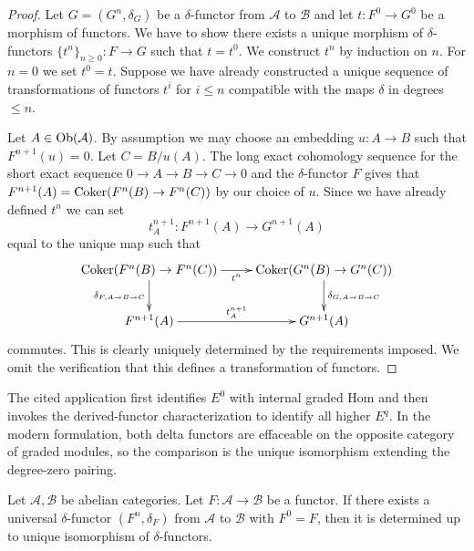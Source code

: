 \begin{proof}
Let $G = (G^n, \delta_G)$ be a $\delta$-functor
from $\mathcal{A}$ to $\mathcal{B}$ and let $t : F^0 \to G^0$
be a morphism of functors. We have to show there exists
a unique morphism of $\delta$-functors $\{t^n\}_{n \geq 0} : F \to G$
such that $t = t^0$. We construct $t^n$ by induction on $n$.
For $n = 0$ we set $t^0 = t$.
Suppose we have already constructed a unique sequence of
transformations of functors $t^i$ for $i \leq n$ compatible with
the maps $\delta$ in degrees $\leq n$.

\medskip\noindent
Let $A \in \mathop{\mathrm{Ob}}\nolimits(\mathcal{A})$. By assumption we may choose
an embedding $u : A \to B$ such that $F^{n + 1}(u) = 0$.
Let $C = B/u(A)$. The long exact cohomology sequence for
the short exact sequence $0 \to A \to B \to C \to 0$ and the
$\delta$-functor $F$ gives that
$F^{n + 1}(A) = \mathop{\mathrm{Coker}}(F^n(B) \to F^n(C))$ by our choice of $u$.
Since we have already defined $t^n$ we can set
$$
t^{n + 1}_A : F^{n + 1}(A) \to G^{n + 1}(A)
$$
equal to the unique map such that
$$
\xymatrix{
\Coker(F^n(B) \to F^n(C)) \ar[r]_{t^n}
\ar[d]_{\delta_{F, A \to B \to C}} &
\Coker(G^n(B) \to G^n(C))
\ar[d]^{\delta_{G, A \to B \to C}} \\
F^{n + 1}(A) \ar[r]^{t^{n + 1}_A} &
G^{n + 1}(A)
}
$$
commutes. This is clearly uniquely determined by the requirements
imposed. We omit the verification that this defines a transformation
of functors.
\end{proof}

\begin{lemma}
\label{lemma-uniqueness-universal-delta-functor}
\begin{reference}
\cite[Chapter III, \S 4, no. 72, axiomatic identification of the
functors $E^q$ with graded Ext, p. 267]{FAC}
\end{reference}
\begin{history}
The cited application first identifies $E^0$ with internal graded Hom and
then invokes the derived-functor characterization to identify all higher
$E^q$. In the modern formulation, both delta functors are effaceable on the
opposite category of graded modules, so the comparison is the unique
isomorphism extending the degree-zero pairing.
\end{history}
Let $\mathcal{A}, \mathcal{B}$ be abelian categories.
Let $F : \mathcal{A} \to \mathcal{B}$ be a functor.
If there exists a universal $\delta$-functor
$(F^n, \delta_F)$ from $\mathcal{A}$ to $\mathcal{B}$
with $F^0 = F$, then it is determined up to unique isomorphism
of $\delta$-functors.
\end{lemma}

